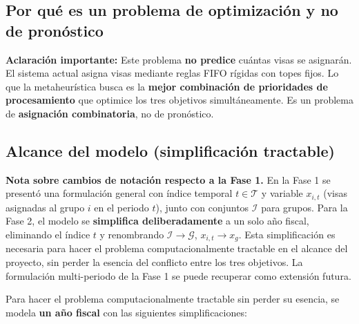 \documentclass[12pt,letterpaper]{article}
\begin{document}
\subsection{Por qué es un problema de optimización y no de pronóstico}

\begin{restrictionbox}
\textbf{Aclaración importante:} Este problema \textbf{no predice} cuántas visas se asignarán. El sistema actual asigna visas mediante reglas FIFO rígidas con topes fijos. Lo que la metaheurística busca es la \textbf{mejor combinación de prioridades de procesamiento} que optimice los tres objetivos simultáneamente. Es un problema de \textbf{asignación combinatoria}, no de pronóstico.
\end{restrictionbox}

\subsection{Alcance del modelo (simplificación tractable)}

\begin{restrictionbox}
\textbf{Nota sobre cambios de notación respecto a la Fase 1.} En la Fase 1 se presentó una formulación general con índice temporal $t \in \mathcal{T}$ y variable $x_{i,t}$ (visas asignadas al grupo $i$ en el periodo $t$), junto con conjuntos $\mathcal{I}$ para grupos. Para la Fase 2, el modelo se \textbf{simplifica deliberadamente} a un solo año fiscal, eliminando el índice $t$ y renombrando $\mathcal{I} \to \mathcal{G}$, $x_{i,t} \to x_g$. Esta simplificación es necesaria para hacer el problema computacionalmente tractable en el alcance del proyecto, sin perder la esencia del conflicto entre los tres objetivos. La formulación multi-periodo de la Fase 1 se puede recuperar como extensión futura.
\end{restrictionbox}

Para hacer el problema computacionalmente tractable sin perder su esencia, se modela \textbf{un año fiscal} con las siguientes simplificaciones:

\begin{table}[H]
\centering
\caption{Simplificaciones del modelo respecto al sistema real.}
\label{tab:simplificaciones}
\renewcommand{\arraystretch}{1.3}
\end{table}
\end{document}
